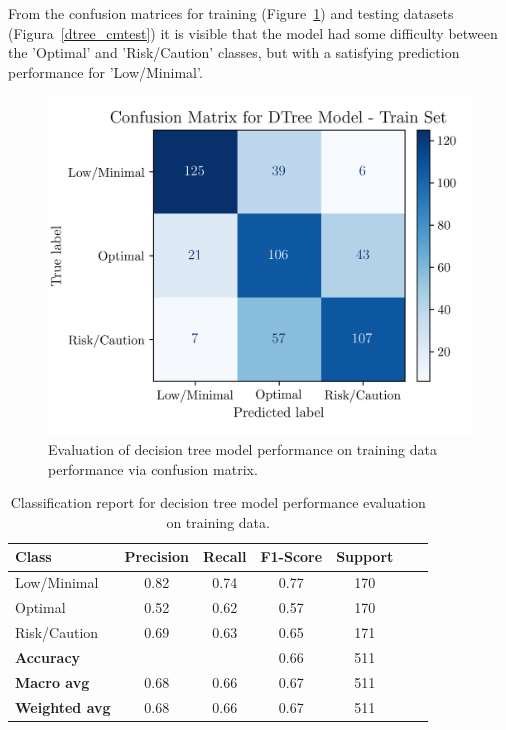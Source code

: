 \documentclass[conference]{IEEEtran}
\begin{document}
From the confusion matrices for training (Figure~\ref{dtree_cmtrain}) and testing datasets (Figura~\ref{dtree_cmtest}) it is visible that the model had some difficulty between the 'Optimal' and 'Risk/Caution' classes, but with a satisfying prediction performance for 'Low/Minimal'.

\begin{figure}[H]
    \centering
    \includegraphics[width=1\linewidth]{assets/DTREE_ConfusionMatrixTrain.png}
    \caption{Evaluation of decision tree model performance on training data performance via confusion matrix.}
    \label{dtree_cmtrain}
\end{figure} %

\begin{table}[H]
\centering
\caption{Classification report for decision tree model performance evaluation on training data.}
\label{cr_dtree_train}
\begin{tabular}{lcccccc}
\toprule
\textbf{Class} & \textbf{Precision} & \textbf{Recall} & \textbf{F1-Score} & \textbf{Support} \\
\midrule
Low/Minimal & 0.82 & 0.74 & 0.77 & 170 \\
Optimal & 0.52 & 0.62 & 0.57 & 170 \\
Risk/Caution & 0.69 & 0.63 & 0.65 & 171 \\
\midrule
\textbf{Accuracy} &  &  & 0.66 & 511 \\
\textbf{Macro avg} & 0.68 & 0.66 & 0.67 & 511 \\
\textbf{Weighted avg} & 0.68 & 0.66 & 0.67 & 511 \\
\bottomrule
\end{tabular}
\end{table} %
\end{document}
